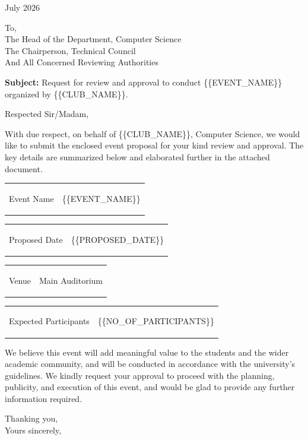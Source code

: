 \documentclass[12pt,a4paper]{article}
\newcommand{\PH}[1]{{\ttfamily\small\{\{#1\}\}}}
\newcommand{\ClubName}{\PH{CLUB\_NAME}}
\newcommand{\DepartmentName}{Computer Science}
\newcommand{\PreparedDate}{25 July 2026}
\newcommand{\EventName}{\PH{EVENT\_NAME}}
\newcommand{\ProposedDate}{\PH{PROPOSED\_DATE}}
\newcommand{\Venue}{Main Auditorium}
\newcommand{\ExpectedParticipants}{\PH{NO\_OF\_PARTICIPANTS}}
\newcommand{\SectionBox}[1]{%
\begin{tcolorbox}[colback=JainFill,colframe=JainBlue,boxrule=0.8pt,arc=1mm,left=6pt,right=6pt,top=5pt,bottom=5pt]
#1
\end{tcolorbox}
}
\newcommand{\InfoRow}[2]{%
\begin{tabularx}{\textwidth}{>{\bfseries\raggedright\arraybackslash}p{0.30\textwidth}X}
#1 & #2
\end{tabularx}\par
}
\begin{document}
\newpage


\vspace*{0.2cm}
\noindent \PreparedDate \hfill

\vspace{0.3cm}

\noindent
To,\\[3pt]
The Head of the Department, \DepartmentName\\
The Chairperson, Technical Council\\
And All Concerned Reviewing Authorities

\vspace{0.3cm}

\noindent \textbf{Subject: } Request for review and approval to conduct \EventName{} organized by \ClubName.

\vspace{0.3cm}

\noindent Respected Sir/Madam,

\vspace{0.25cm}

\noindent
With due respect, on behalf of \ClubName, \DepartmentName, we would like to submit the enclosed event proposal for your kind review and approval. The key details are summarized below and elaborated further in the attached document.

\vspace{0.3cm}

\SectionBox{
\InfoRow{Event Name}{\EventName}
\InfoRow{Proposed Date}{\ProposedDate}
\InfoRow{Venue}{\Venue}
\InfoRow{Expected Participants}{\ExpectedParticipants}
}

\vspace{0.3cm}

\noindent
We believe this event will add meaningful value to the students and the wider academic community, and will be conducted in accordance with the university's guidelines. We kindly request your approval to proceed with the planning, publicity, and execution of this event, and would be glad to provide any further information required.

\vspace{0.4cm}

\noindent Thanking you,\\
\noindent Yours sincerely,

\vspace{1.4cm}
\end{document}
